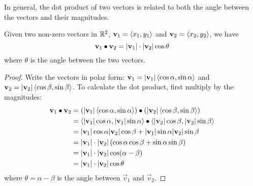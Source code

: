 \documentclass[handout]{ximera}
\begin{document}
\begin{image}
\end{image}

In general, the dot product of two vectors is related to both the angle between the vectors and their magnitudes.

\begin{proposition}
Given two non-zero vectors in $\mathbb R^2$, $\mathbf{v}_1 = \left\langle x_1, y_1\right\rangle$ and $\mathbf{v}_2 = \left\langle x_2, y_2\right\rangle$, we have
\[
\mathbf{v}_1 \bullet \mathbf{v}_2 = |\mathbf{v}_1| \cdot |\mathbf{v}_2| \cos \theta
\]
where $\theta$ is the angle between the two vectors.
\begin{proof}
Write the vectors in polar form: $\mathbf{v}_1 = |\mathbf{v}_1| \left\langle \cos \alpha, \sin \alpha\right\rangle$ and 
$\mathbf{v}_2 = |\mathbf{v}_2| \left\langle \cos \beta, \sin \beta\right\rangle$. To calculate the dot product, first multiply by the magnitudes:
\begin{align*}
\mathbf{v}_1 \bullet \mathbf{v}_2 & = \left(|\mathbf{v}_1| \left\langle \cos \alpha, \sin \alpha\right\rangle\right) \bullet \left( |\mathbf{v}_2| \left\langle \cos \beta, \sin \beta\right\rangle \right)\\
                            &= \left\langle |\mathbf{v}_1|\cos \alpha, |\mathbf{v}_1|\sin \alpha\right\rangle \bullet   \left\langle |\mathbf{v}_2|\cos \beta, |\mathbf{v}_2|\sin \beta\right\rangle \\
                            &= |\mathbf{v}_1| \cos \alpha |\mathbf{v}_2|\cos \beta + |\mathbf{v}_1|\sin \alpha |\mathbf{v}_2|\sin \beta\\
                            &= |\mathbf{v}_1|\cdot |\mathbf{v}_2| \left(\cos \alpha \cos \beta + \sin \alpha \sin \beta\right)\\
                            &= |\mathbf{v}_1| \cdot|\mathbf{v}_2| \cos(\alpha - \beta)\\
                            &= |\mathbf{v}_1| \cdot |\mathbf{v}_2| \cos \theta
\end{align*}
where $\theta = \alpha - \beta$ is the angle between $\vec{v}_1$ and $\vec{v}_2$.
\end{proof}
\end{proposition}
\end{document}
